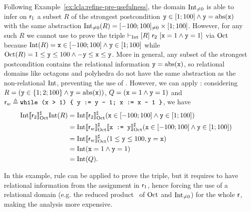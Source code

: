 \begin{example}
	Following Example~\ref{ex:lcla:refine-pre-usefulness}, the domain $\text{Int}_{\neq 0}$ is able to infer on $\mathsf{r}_1$ a subset $R$ of the strongest postcondition $\texttt{y} \in [1; 100] \land \texttt{y} = \text{abs}(\texttt{x})$ with the same abstraction $\text{Int}_{\neq 0}(R) = [-100; 100]_{\neq 0} \times [1; 100]$. However, for any such $R$ we cannot use  to prove the triple $\vdash_{\text{Int}}\nobreak[R]~\mathsf{r}_2~[\texttt{x} = 1 \land \texttt{y} = 1]$ via $\text{Oct}$ because $\text{Int}(R) = \texttt{x} \in [-100; 100] \land \texttt{y} \in [1; 100]$ while $\text{Oct}(R) = 1 \le \texttt{y} \le 100 \land -\texttt{y} \le \texttt{x} \le \texttt{y}$. More in general, any subset of the strongest postcondition contains the relational information $\texttt{y} = \text{abs}(\texttt{x})$, so relational domains like octagons and polyhedra \cite{CH78} do not have the same abstraction as the non-relational $\text{Int}$, preventing the use of . However, we can apply : considering $R = (\texttt{y} \in \{1; 2; 100\} \land \texttt{y} = \text{abs}(\texttt{x}) )$, $Q = (\texttt{x} = 1 \land \texttt{y} = 1)$ and $\mathsf{r}_w \triangleq \texttt{while (x > 1) \{ y := y - 1; x := x - 1 \}}$, we have
	\begin{align*}
		\text{Int} \llbracket\mathsf{r}_2\rrbracket^{\sharp}_{\text{Oct}} \text{Int}(R) & = \text{Int} \llbracket\mathsf{r}_2\rrbracket^{\sharp}_{\text{Oct}} (\texttt{x} \in [-100; 100] \land \texttt{y} \in [1; 100])                                       \\
		                                             & = \text{Int} \llbracket\mathsf{r}_w\rrbracket^{\sharp}_{\text{Oct}} \llbracket\texttt{x := y}\rrbracket^{\sharp}_{\text{Oct}} (\texttt{x} \in [-100; 100] \land \texttt{y} \in [1; 100]) \\
		                                             & = \text{Int} \llbracket\mathsf{r}_w\rrbracket^{\sharp}_{\text{Oct}} (1 \le \texttt{y} \le 100, \texttt{y} = \texttt{x})                                                \\
		                                             & = \text{Int}(\texttt{x} = 1 \land \texttt{y} = 1)                                                                                             \\
		                                             & = \text{Int}(Q) .
	\end{align*}

	In this example, rule  can be applied to prove the triple, but it requires to have relational information from the assignment  in $\mathsf{r}_1$, hence forcing the use of a relational domain (e.g. the reduced product~\cite{CC79} of $\text{Oct}$ and $\text{Int}_{\neq 0}$) for the whole $\mathsf{r}$, making the analysis more expensive.
\end{example}

